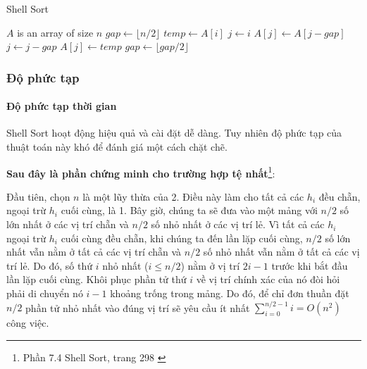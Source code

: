 \begin{algorithm}[H]
\caption{Shell Sort}
\label{alg:shell-sort}
\begin{algorithmic}

\Require $A$ is an array of size $n$
\State $gap \gets \lfloor n / 2 \rfloor$ 
 
     
        \State $temp \gets A[i]$ 
        \State $j \gets i$
         
            \State $A[j] \gets A[j-gap]$ 
            \State $j \gets j - gap$
        \EndWhile
        \State $A[j] \gets temp$ 
    \EndFor
    \State $gap \gets \lfloor gap / 2 \rfloor$ 
\EndWhile
\EndFunction

\end{algorithmic}
\end{algorithm}


\subsubsection{Độ phức tạp}

\paragraph{Độ phức tạp thời gian} 
Shell Sort hoạt động hiệu quả và cài đặt dễ dàng. Tuy nhiên độ phức tạp của thuật toán này khó để đánh giá một cách chặt chẽ.

\textbf{Sau đây là phần chứng minh cho trường hợp tệ nhất}\footnote{Phần 7.4 Shell Sort, trang 298 \cite{dsa-analysis-cpp}}:

Đầu tiên, chọn $n$ là một lũy thừa của 2. Điều này làm cho tất cả các $h_i$ đều chẵn, ngoại trừ $h_i$ cuối cùng, là 1. Bây giờ, chúng ta sẽ đưa vào một mảng với $n/2$ số lớn nhất ở các vị trí chẵn và $n/2$ số nhỏ nhất ở các vị trí lẻ. Vì tất cả các $h_i$ ngoại trừ $h_i$ cuối cùng đều chẵn, khi chúng ta đến lần lặp cuối cùng, $n/2$ số lớn nhất vẫn nằm ở tất cả các vị trí chẵn và $n/2$ số nhỏ nhất vẫn nằm ở tất cả các vị trí lẻ. Do đó, số thứ $i$ nhỏ nhất ($i\leq n/2$) nằm ở vị trí $2i - 1$ trước khi bắt đầu lần lặp cuối cùng. Khôi phục phần tử thứ $i$ về vị trí chính xác của nó đòi hỏi phải di chuyển nó $i-1$ khoảng trống trong mảng. Do đó, để chỉ đơn thuần đặt $n/2$ phần tử nhỏ nhất vào đúng vị trí sẽ yêu cầu ít nhất $\sum_{i=0}^{n/2 - 1}i=O(n^{2})$ công việc.


